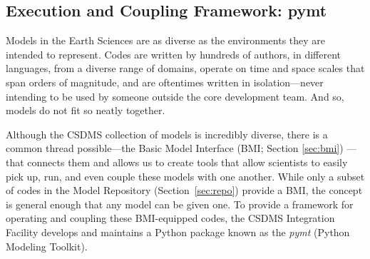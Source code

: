 \documentclass[journal abbreviation, manuscript]{copernicus}
\begin{document}
\subsection{Execution and Coupling Framework: pymt}
\label{sec:pymt}

Models in the Earth Sciences are as diverse as the environments they are intended to represent.
Codes are written by hundreds of authors, in different languages, from a diverse range of domains,
operate on time and space scales that span orders of magnitude,
and are oftentimes written in isolation---never intending to be used
by someone outside the core development team. And so, models do not fit so neatly together.

Although the CSDMS collection of models is incredibly diverse,
there is a common thread possible---the Basic Model Interface (BMI; Section \ref{sec:bmi})
---that connects them and allows us to
create tools that allow scientists to easily pick up, run,
and even couple these models with one another. While only a subset of codes in the Model Repository (Section~\ref{sec:repo}) provide a BMI, the concept is general enough that
any model can be given one. To provide a framework for operating and coupling these BMI-equipped codes, the CSDMS Integration Facility develops and maintains a Python package known as the \textit{pymt} 
(Python Modeling Toolkit).
\end{document}
